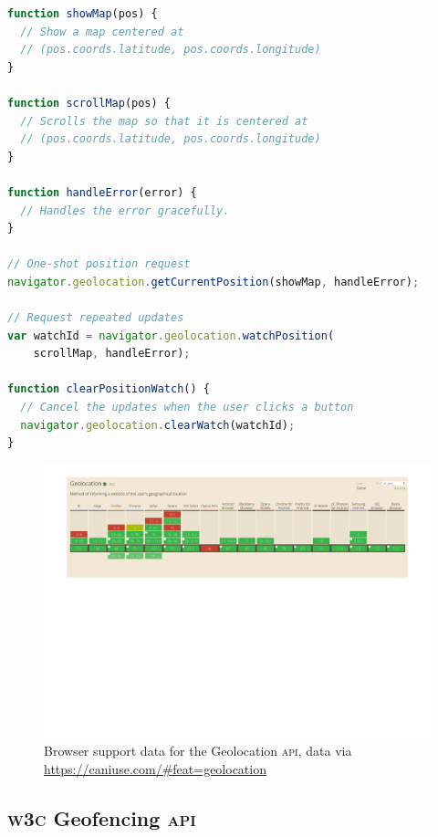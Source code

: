 \documentclass[sigconf,hyphens]{acmart}
\begin{document}
\begin{lstlisting}[caption={Geolocation \textsc{api}},
  label=code:geolocation, language=JavaScript, float=h] 
function showMap(pos) {
  // Show a map centered at
  // (pos.coords.latitude, pos.coords.longitude)
}

function scrollMap(pos) {
  // Scrolls the map so that it is centered at
  // (pos.coords.latitude, pos.coords.longitude)
}

function handleError(error) {
  // Handles the error gracefully.
}

// One-shot position request
navigator.geolocation.getCurrentPosition(showMap, handleError);

// Request repeated updates
var watchId = navigator.geolocation.watchPosition(
    scrollMap, handleError);

function clearPositionWatch() {
  // Cancel the updates when the user clicks a button
  navigator.geolocation.clearWatch(watchId);
}	
\end{lstlisting}

\begin{figure}[h]
  \includegraphics[width=\linewidth,trim=2.5cm 17.5cm 2.5cm 0cm]{caniuse.pdf}
  \caption{Browser support data for the Geolocation \textsc{api},
    data via \url{https://caniuse.com/\#feat=geolocation}}
  \label{fig:caniuse}
\end{figure}

\subsection{\textsc{w3c} Geofencing \textsc{api}}
\end{document}
